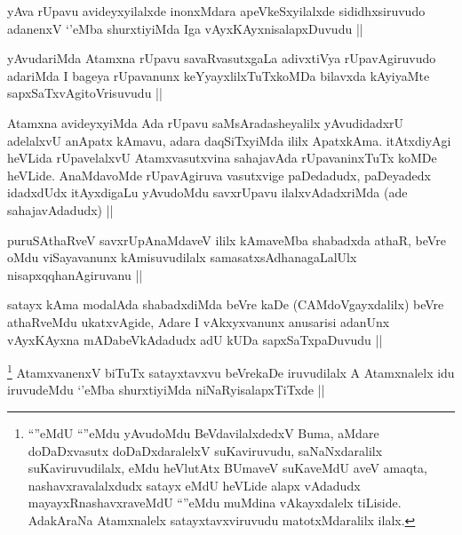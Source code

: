 
\begin{artha}
yAva rUpavu avideyxyilalxde inonxMdara apeVkeSxyilalxde sididhxsiruvudo adanenxV `\stext'eMba shurxtiyiMda Iga vAyxKAyxnisalapxDuvudu ||
\end{artha}

\begin{artha}
yAvudariMda Atamxna rUpavu savaRvasutxgaLa adivxtiVya rUpavAgiruvudo adariMda I bageya rUpavanunx keYyayxlilxTuTxkoMDa bilavxda kAyiyaMte sapxSaTxvAgitoVrisuvudu ||
\end{artha}


\begin{artha}
Atamxna avideyxyiMda Ada rUpavu saMsAradasheyalilx yAvudidadxrU adelalxvU anApatx kAmavu, adara daqSiTxyiMda ililx ApatxkAma. itAtxdiyAgi heVLida rUpavelalxvU Atamxvasutxvina sahajavAda rUpavaninxTuTx koMDe heVLide. AnaMdavoMde rUpavAgiruva vasutxvige paDedadudx, paDeyadedx idadxdUdx itAyxdigaLu yAvudoMdu savxrUpavu ilalxvAdadxriMda (ade sahajavAdadudx) ||
\end{artha}


\begin{artha}
puruSAthaRveV savxrUpAnaMdaveV ililx kAmaveMba shabadxda athaR, beVre oMdu viSayavanunx kAmisuvudilalx samasatxsAdhanagaLalUlx nisapxqqhanAgiruvanu ||
\end{artha}


\begin{artha}
satayx kAma modalAda shabadxdiMda beVre kaDe (CAMdoVgayxdalilx) beVre athaRveMdu ukatxvAgide, Adare I vAkxyxvanunx anusarisi adanUnx vAyxKAyxna mADabeVkAdadudx adU kUDa sapxSaTxpaDuvudu ||
\end{artha}


\begin{artha}
\footnote{``\stext''eMdU ``\stext''eMdu yAvudoMdu BeVdavilalxdedxV Buma, aMdare doDaDxvasutx doDaDxdaralelxV suKaviruvudu, saNaNxdaralilx suKaviruvudilalx, eMdu heVlutAtx BUmaveV suKaveMdU aveV amaqta, nashavxravalalxdudx satayx eMdU heVLide alapx vAdadudx mayayxRnashavxraveMdU ``\stext''eMdu muMdina vAkayxdalelx tiLiside. AdakAraNa Atamxnalelx satayxtavxviruvudu matotxMdaralilx ilalx.}
AtamxvanenxV biTuTx satayxtavxvu beVrekaDe iruvudilalx A Atamxnalelx idu iruvudeMdu `\stext'eMba shurxtiyiMda niNaRyisalapxTiTxde ||
\end{artha}

